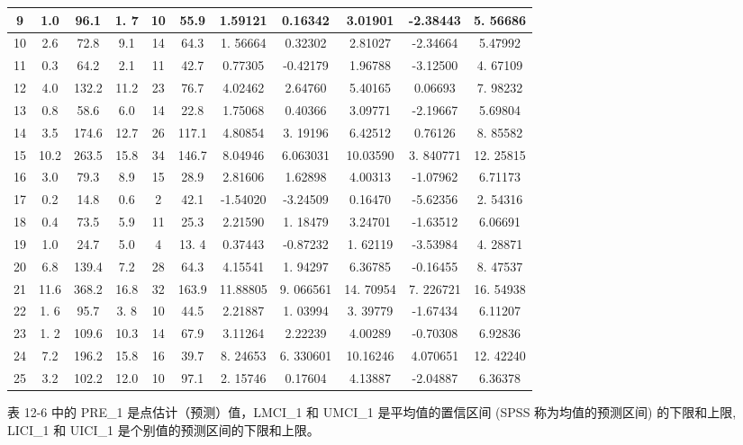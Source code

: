 \documentclass[10pt]{article}
\begin{document}
\begin{CJK*}{UTF8}{bsmi}
\begin{center}
\begin{tabular}{|c|c|c|c|c|c|c|c|c|c|c|}
\hline
9 & 1.0 & 96.1 & 1. 7 & 10 & 55.9 & 1.59121 & 0.16342 & 3.01901 & -2.38443 & 5. 56686 \\
\hline
10 & 2.6 & 72.8 & 9.1 & 14 & 64.3 & 1. 56664 & 0.32302 & 2.81027 & -2.34664 & 5.47992 \\
\hline
11 & 0.3 & 64.2 & 2.1 & 11 & 42.7 & 0.77305 & -0.42179 & 1.96788 & -3.12500 & 4. 67109 \\
\hline
12 & 4.0 & 132.2 & 11.2 & 23 & 76.7 & 4.02462 & 2.64760 & 5.40165 & 0.06693 & 7. 98232 \\
\hline
13 & 0.8 & 58.6 & 6.0 & 14 & 22.8 & 1.75068 & 0.40366 & 3.09771 & -2.19667 & 5.69804 \\
\hline
14 & 3.5 & 174.6 & 12.7 & 26 & 117.1 & 4.80854 & 3. 19196 & 6.42512 & 0.76126 & 8. 85582 \\
\hline
15 & 10.2 & 263.5 & 15.8 & 34 & 146.7 & 8.04946 & 6.063031 & 10.03590 & 3. 840771 & 12. 25815 \\
\hline
16 & 3.0 & 79.3 & 8.9 & 15 & 28.9 & 2.81606 & 1.62898 & 4.00313 & -1.07962 & 6.71173 \\
\hline
17 & 0.2 & 14.8 & 0.6 & 2 & 42.1 & -1.54020 & -3.24509 & 0.16470 & -5.62356 & 2. 54316 \\
\hline
18 & 0.4 & 73.5 & 5.9 & 11 & 25.3 & 2.21590 & 1. 18479 & 3.24701 & -1.63512 & 6.06691 \\
\hline
19 & 1.0 & 24.7 & 5.0 & 4 & 13. 4 & 0.37443 & -0.87232 & 1. 62119 & -3.53984 & 4. 28871 \\
\hline
20 & 6.8 & 139.4 & 7.2 & 28 & 64.3 & 4.15541 & 1. 94297 & 6.36785 & -0.16455 & 8. 47537 \\
\hline
21 & 11.6 & 368.2 & 16.8 & 32 & 163.9 & 11.88805 & 9. 066561 & 14. 70954 & 7. 226721 & 16. 54938 \\
\hline
22 & 1. 6 & 95.7 & 3. 8 & 10 & 44.5 & 2.21887 & 1. 03994 & 3. 39779 & -1.67434 & 6.11207 \\
\hline
23 & 1. 2 & 109.6 & 10.3 & 14 & 67.9 & 3.11264 & 2.22239 & 4.00289 & -0.70308 & 6.92836 \\
\hline
24 & 7.2 & 196.2 & 15.8 & 16 & 39.7 & 8. 24653 & 6. 330601 & 10.16246 & 4.070651 & 12. 42240 \\
\hline
25 & 3.2 & 102.2 & 12.0 & 10 & 97.1 & 2. 15746 & 0.17604 & 4.13887 & -2.04887 & 6.36378 \\
\hline
\end{tabular}
\end{center}

表 12-6 中的 PRE\_1 是点估计（预测）值，LMCI\_1 和 UMCI\_1 是平均值的置信区间 (SPSS 称为均值的预测区间) 的下限和上限, LICI\_1 和 UICI\_1 是个别值的预测区间的下限和上限。


\end{CJK*}
\end{document}
